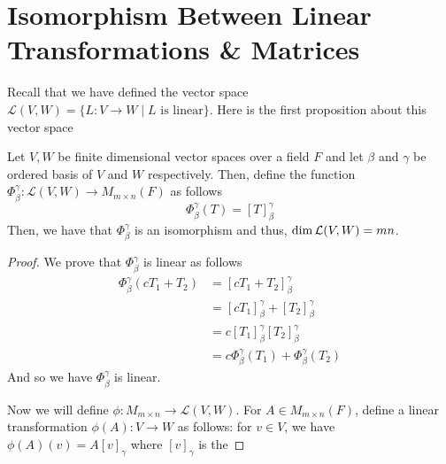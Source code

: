 \documentclass[main.tex]{subfiles}
\begin{document}
    \chapter{ Isomorphism Between Linear Transformations \& Matrices}

    Recall that we have defined the vector space $\mathcal{L}(V,W) = \{L: V \to W \mid L \text{ is linear} \}$. Here is the first proposition about this vector space
    \begin{thrm}{}{}
        Let $V,W$ be finite dimensional vector spaces over a field $F$ and let $\beta$ and $\gamma$ be ordered basis of $V$ and $W$ respectively. Then, define the function $\Phi_\beta^\gamma : \mathcal{L}(V,W) \to M_{m\times n}(F)$ as follows
        \begin{equation*}
            \Phi_\beta^\gamma(T) = [T]_\beta^\gamma
        \end{equation*}
        Then, we have that $\Phi_\beta^\gamma$ is an isomorphism and thus, $\operatorname{dim} \mathcal{L}(V,W) = mn$.
    \end{thrm}
    \begin{proof}
        We prove that $\Phi_\beta^\gamma$ is linear as follows
        \begin{align*}
            \Phi_\beta^\gamma(cT_1 + T_2) &= [ cT_1 + T_2]_\beta^\gamma \\
            &= [cT_1]_\beta^\gamma + [T_2]_\beta^\gamma \\
            &= c[T_1]_\beta^\gamma [T_2]_\beta^\gamma \\
            &= c\Phi_\beta^\gamma (T_1) + \Phi_\beta^\gamma (T_2)
        \end{align*}
        And so we have $\Phi_\beta^\gamma$ is linear. \par 

        Now we will define $\phi : M_{m\times n} \to \mathcal{L}(V,W)$. For $A\in M_{m\times n}(F)$, define a linear transformation $\phi(A): V\to W$ as follows: for $v\in V$, we have $\phi(A)(v) = A[v]_\gamma$ where $[v]_\gamma$ is the 
    \end{proof}
\end{document}
